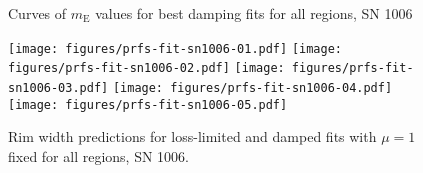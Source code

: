 \documentclass[manuscript]{aastex}  %
\newcommand*{\mt}{\mathrm}
\newcommand*{\mE}{m_\mt{E}}
\begin{document}
\clearpage
\begin{figure}
    \centering
    \iftoggle{manuscript}{
        \texttt{[image: figures/mE-damp-sn1006.pdf]}
    }{
        \texttt{[image: figures/mE-damp-sn1006.pdf]}
    }
    \caption{Curves of $\mE$ values for best damping fits for all regions,
        SN 1006}
\end{figure}

\begin{figure*}[h]
    \centering
    \texttt{[image: figures/prfs-fit-sn1006-01.pdf]}
    \texttt{[image: figures/prfs-fit-sn1006-02.pdf]}
    \texttt{[image: figures/prfs-fit-sn1006-03.pdf]}
    \texttt{[image: figures/prfs-fit-sn1006-04.pdf]}
    \texttt{[image: figures/prfs-fit-sn1006-05.pdf]}
    \caption{Rim width predictions for loss-limited and damped fits with
    $\mu = 1$ fixed for all regions, SN 1006.}
\end{figure*}

\end{document}
